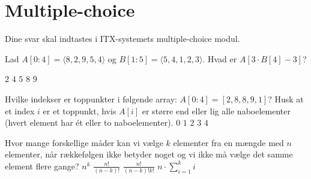 \section*{Multiple-choice}\label{sec:mc}

Dine svar skal indtastes i ITX-systemets multiple-choice modul.

\multiplechoicestart



Lad \(A[0:4] = \langle 8, 2, 9, 5, 4 \rangle\) og \(B[1:5] = \langle 5, 4, 1, 2, 3 \rangle\).
Hvad er \(A[3 \cdot B[4]-3]\)?
\etsvar

\mulighederstart
\svar \(2\)
\svar \(4\)
\svar \(5\) \korrekt
\svar \(8\)
\svar \(9\)
\mulighederslut
{}

Hvilke indekser er toppunkter i følgende array: \(A[0:4] = [2,8,8,9,1]\)?
Husk at et index \(i\) er et toppunkt, hvis \(A[i]\) er større end eller lig alle naboelementer (hvert element har ét eller to naboelementer).
\fleresvar
\mulighederstart
\svar \(0\)
\svar \(1\) \korrekt
\svar \(2\)
\svar \(3\) \korrekt
\svar \(4\)
\mulighederslut
{}

Hvor mange forskellige måder kan vi vælge \(k\) elementer fra en mængde med
\(n\) elementer, når rækkefølgen ikke betyder noget og vi ikke må vælge det samme element
flere gange?
\etsvar
\mulighederstart
\svar \(n^{k}\)
\svar \(\frac{n!}{(n-k)!}\)
\svar \(\frac{n!}{(n-k)!k!}\) \korrekt
\svar \(n \cdot \sum_{i=1}^{k} i\)
\mulighederslut
{}


